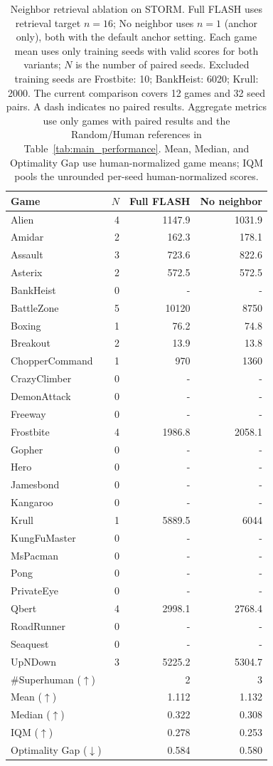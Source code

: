 \documentclass{article} %
\begin{document}
\begin{table}[!t]
\centering
\small
\caption{Neighbor retrieval ablation on STORM. Full FLASH uses retrieval target $n=16$; No neighbor uses $n=1$ (anchor only), both with the default anchor setting. Each game mean uses only training seeds with valid scores for both variants; $N$ is the number of paired seeds. Excluded training seeds are Frostbite: 10; BankHeist: 6020; Krull: 2000. The current comparison covers 12 games and 32 seed pairs. A dash indicates no paired results. Aggregate metrics use only games with paired results and the Random/Human references in Table~\ref{tab:main_performance}. Mean, Median, and Optimality Gap use human-normalized game means; IQM pools the unrounded per-seed human-normalized scores.}
\label{tab:neighbor_retrieval_ablation}
\begin{tabular}{lrrr}
\toprule
Game & $N$ & Full FLASH & No neighbor \\
\midrule
Alien & 4 & 1147.9 & 1031.9 \\
Amidar & 2 & 162.3 & 178.1 \\
Assault & 3 & 723.6 & 822.6 \\
Asterix & 2 & 572.5 & 572.5 \\
BankHeist & 0 & - & - \\
BattleZone & 5 & 10120 & 8750 \\
Boxing & 1 & 76.2 & 74.8 \\
Breakout & 2 & 13.9 & 13.8 \\
ChopperCommand & 1 & 970 & 1360 \\
CrazyClimber & 0 & - & - \\
DemonAttack & 0 & - & - \\
Freeway & 0 & - & - \\
Frostbite & 4 & 1986.8 & 2058.1 \\
Gopher & 0 & - & - \\
Hero & 0 & - & - \\
Jamesbond & 0 & - & - \\
Kangaroo & 0 & - & - \\
Krull & 1 & 5889.5 & 6044 \\
KungFuMaster & 0 & - & - \\
MsPacman & 0 & - & - \\
Pong & 0 & - & - \\
PrivateEye & 0 & - & - \\
Qbert & 4 & 2998.1 & 2768.4 \\
RoadRunner & 0 & - & - \\
Seaquest & 0 & - & - \\
UpNDown & 3 & 5225.2 & 5304.7 \\
\midrule
\#Superhuman ($\uparrow$) &  & 2 & 3 \\
Mean ($\uparrow$) &  & 1.112 & 1.132 \\
Median ($\uparrow$) &  & 0.322 & 0.308 \\
IQM ($\uparrow$) &  & 0.278 & 0.253 \\
Optimality Gap ($\downarrow$) &  & 0.584 & 0.580 \\
\bottomrule
\end{tabular}
\end{table}
\end{document}
